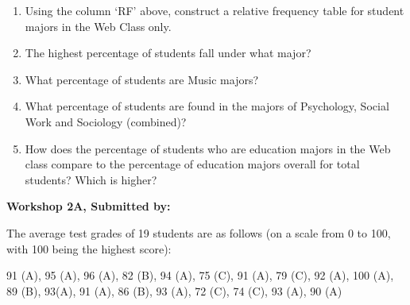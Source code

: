 \documentclass[11pt, chapterprefix=true]{scrbook}\usepackage[]{graphicx}\usepackage[]{color}
\begin{document}
\begin{exercises}
\begin{solution}
  \begin{enumerate}
  \item	Using the column `RF' above, construct a relative frequency table for student majors in the Web Class only.
  \item	The highest percentage of students fall under what major?
  \item	What percentage of students are Music majors?
  \item	What percentage of students are found in the majors of Psychology, Social Work and Sociology (combined)?
  \item	How does the percentage of students who are education majors in the Web class compare to the percentage of education majors overall for total students?  Which is higher? 
\end{enumerate}
    \end{solution}    
    

\clearpage

    \begin{exercise}  %
    
    \begin{center}
\begin{flushleft}\textbf{ \large \hfill Workshop 2A, Submitted by: }\end{flushleft}

\end{center}

The average test grades of 19 students are as follows (on a scale from 0 to 100, with 100 being the highest score):

91 (A), 95 (A), 96 (A), 82 (B), 94 (A), 75 (C), 91 (A), 79 (C), 92 (A), 100 (A), 89 (B), 93(A), 91 (A), 86 (B), 93 (A), 72 (C), 74 (C), 93 (A), 90 (A)


\end{exercise}
\end{exercises}
\end{document}
